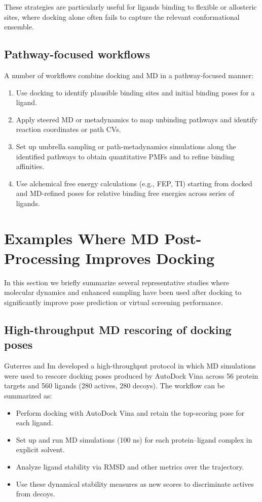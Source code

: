 \documentclass[12pt]{article}
\begin{document}
These strategies are particularly useful for ligands binding to flexible or allosteric sites, where docking alone often fails to capture the relevant conformational ensemble.

\subsection{Pathway-focused workflows}

A number of workflows combine docking and MD in a pathway-focused manner:

\begin{enumerate}
\item Use docking to identify plausible binding sites and initial binding poses for a ligand.
\item Apply steered MD or metadynamics to map unbinding pathways and identify reaction coordinates or path CVs.
\item Set up umbrella sampling or path-metadynamics simulations along the identified pathways to obtain quantitative PMFs and to refine binding affinities.
\item Use alchemical free energy calculations (e.g., FEP, TI) starting from docked and MD-refined poses for relative binding free energies across series of ligands.
\end{enumerate}

\section{Examples Where MD Post-Processing Improves Docking}

In this section we briefly summarize several representative studies where molecular dynamics and enhanced sampling have been used after docking to significantly improve pose prediction or virtual screening performance.

\subsection{High-throughput MD rescoring of docking poses}

Guterres and Im developed a high-throughput protocol in which MD simulations were used to rescore docking poses produced by AutoDock Vina across 56 protein targets and 560 ligands (280 actives, 280 decoys).\cite{CH9_guterres2020} The workflow can be summarized as:

\begin{itemize}
\item Perform docking with AutoDock Vina and retain the top-scoring pose for each ligand.
\item Set up and run MD simulations (100 ns) for each protein--ligand complex in explicit solvent.
\item Analyze ligand stability via RMSD and other metrics over the trajectory.
\item Use these dynamical stability measures as new scores to discriminate actives from decoys.
\end{itemize}
\end{document}
